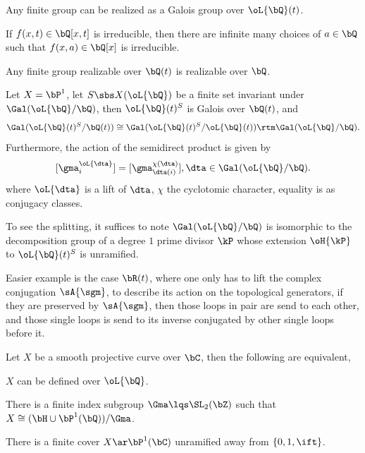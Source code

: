 \documentclass[0-main]{subfiles}
\begin{document}
\begin{cor}
	Any finite group can be realized as a Galois group over $\oL{\bQ}(t)$.
\end{cor}

\begin{thm}
	If $f(x,t)\in\bQ[x,t]$ is irreducible, then there are infinite many choices of $a\in\bQ$ such that $f(x,a)\in\bQ[x]$ is irreducible.
\end{thm}

\begin{cor}
	Any finite group realizable over $\bQ(t)$ is realizable over $\bQ$.
\end{cor}


\begin{thm}
	Let $X=\bP^{1}$, let $S\sbs X(\oL{\bQ})$ be a finite set invariant under $\Gal(\oL{\bQ}/\bQ)$, then $\oL{\bQ}(t)^{S}$ is Galois over $\bQ(t)$, and
	\[
		\Gal(\oL{\bQ}(t)^{S}/\bQ(t))\cong\Gal(\oL{\bQ}(t)^{S}/\oL{\bQ}(t))\rtm\Gal(\oL{\bQ}/\bQ).
	\]
	Furthermore, the action of the semidirect product is given by
	\[
		[\gma_{i}^{\oL{\dta}}]=[\gma_{\dta(i)}^{\chi(\dta)}], \dta\in\Gal(\oL{\bQ}/\bQ).
	\]
	where $\oL{\dta}$ is a lift of $\dta$, $\chi$ the cyclotomic character, equality is as conjugacy classes.
\end{thm}

\begin{rmk}
	To see the splitting, it suffices to note $\Gal(\oL{\bQ}/\bQ)$ is isomorphic to the decomposition group of a degree $1$ prime divisor $\kP$ whose extension $\oH{\kP}$ to $\oL{\bQ}(t)^{S}$ is unramified.

	Easier example is the case $\bR(t)$, where one only has to lift the complex conjugation $\sA{\sgm}$, to describe its action on the topological generators, if they are preserved by $\sA{\sgm}$, then those loops in pair are send to each other, and those single loops is send to its inverse conjugated by other single loops before it.
\end{rmk}

\begin{thm}
	Let $X$ be a smooth projective curve over $\bC$, then the following are equivalent,
	\begin{enr}
		\item $X$ can be defined over $\oL{\bQ}$.
		\item There is a finite index subgroup $\Gma\lqs\SL_{2}(\bZ)$ such that $X\cong(\bH\cup\bP^{1}(\bQ))/\Gma$.
		\item There is a finite cover $X\ar\bP^{1}(\bC)$ unramified away from $\{0,1,\ift\}$.
	\end{enr}
\end{thm}
\end{document}
